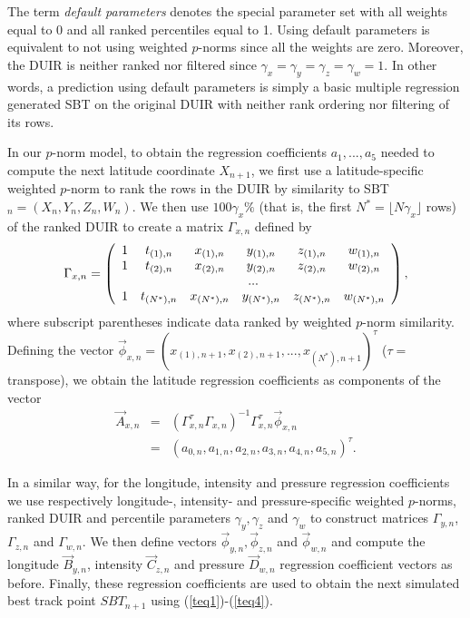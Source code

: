 \documentclass{SBCbookchapter}
\begin{document}
                The term \emph{default parameters} denotes the special parameter set with all weights equal to 0 and all ranked percentiles equal to 1.  Using default parameters is equivalent to not using weighted $p$-norms since all the weights are zero. Moreover, the DUIR is neither ranked nor filtered since $\gamma_x=\gamma_y=\gamma_z=\gamma_w=1$.  In other words, a prediction using default parameters  is simply a basic multiple regression generated SBT on the original DUIR with neither rank ordering nor filtering of its rows.

          In our $p$-norm model, to obtain the regression coefficients $a_1,...,a_5$ needed to compute the next latitude coordinate $X_{n+1}$, we first use a latitude-specific weighted $p$-norm  to rank the rows in the DUIR by similarity to SBT$_n=(X_{n},Y_{n},Z_{n}, W_n)$. We then use $100\gamma_x\%$  (that is, the first  $N^*=\lfloor N\gamma_x \rfloor $ rows) of the ranked DUIR to create a matrix $\Gamma_{x,n}$ defined by
\begin{displaymath}
\Gamma_{x,n}=\left( \begin{array}{cccccc}
1 & t_{(1),n}&x_{(1),n}& y_{(1),n} & z_{(1),n} &w_{(1),n}\\
1 & t_{(2),n}&x_{(2),n}& y_{(2),n} & z_{(2),n} &w_{(2),n}\\
\multicolumn{6}{c}{...}\\
1 & t_{(N^*),n}& x_{(N^*),n}&  y_{(N^*),n} & z_{(N^*),n} &w_{(N^*),n}\\
\end{array}
\right ),
\end{displaymath}
{\flushleft where subscript parentheses} indicate data ranked by weighted $p$-norm similarity.  Defining the vector  $\stackrel{\rightarrow}{\phi}_{x,n}=(x_{(1),n+1}, x_{(2),n+1},..., x_{(N^*),n+1})^{\tau}$ ($\tau=$ transpose), we  obtain the latitude regression coefficients as components of the vector
\begin{eqnarray}
\stackrel{\rightarrow}{A}_{x,n}& = &(\Gamma_{x,n}^{\tau}\Gamma_{x,n})^{-1}\Gamma_{x,n}^{\tau}\stackrel{\rightarrow}{\phi}_{x,n} \label{regeq1}\\
  &= &(a_{0,n},a_{1,n},a_{2,n},a_{3,n},a_{4,n},a_{5,n})^{\tau}.\nonumber
\end{eqnarray}

In a similar way, for the longitude, intensity and pressure regression coefficients we use respectively longitude-, intensity- and pressure-specific weighted $p$-norms, ranked DUIR and percentile parameters $\gamma_y,\gamma_z$ and $\gamma_w$ to construct matrices $\Gamma_{y,n}$,$\Gamma_{z,n}$ and $\Gamma_{w,n}$. We then define vectors  $\stackrel{\rightarrow}{\phi}_{y,n}, \stackrel{\rightarrow}{\phi}_{z,n}$ and $\stackrel{\rightarrow}{\phi}_{w,n}$ and compute the longitude $\stackrel{\rightarrow}{B}_{y,n}$, intensity $\stackrel{\rightarrow}{C}_{z,n}$ and pressure $\stackrel{\rightarrow}{D}_{w,n}$ regression coefficient vectors as before. Finally, these regression coefficients are used to obtain the next simulated best track point  $SBT_{n+1}$ using (\ref{teq1})-(\ref{teq4}).
\end{document}
